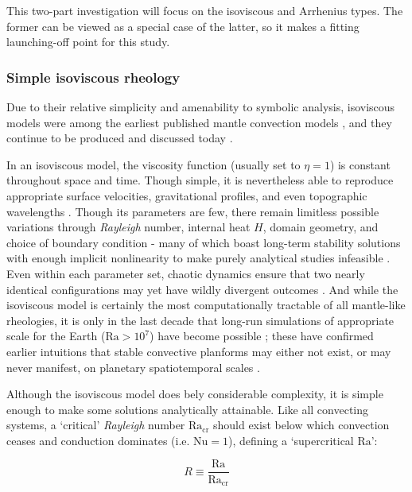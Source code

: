 \documentclass[a4paper,11pt,oneside]{book}
\begin{document}
This two-part investigation will focus on the isoviscous and Arrhenius types. The former can be viewed as a special case of the latter, so it makes a fitting launching-off point for this study.

\subsubsection{Simple isoviscous rheology}

Due to their relative simplicity and amenability to symbolic analysis, isoviscous models were among the earliest published mantle convection models \citet{McKenzie1973-gt, McKenzie1974-wb, Jarvis1986-me, Blankenbach1989-li}, and they continue to be produced and discussed today \citet{Zhong2005-lh, Weller2016-cc, Weller2016-nm, Vilella2018-il}.

In an isoviscous model, the viscosity function (usually set to $\eta=1$) is constant throughout space and time. Though simple, it is nevertheless able to reproduce appropriate surface velocities, gravitational profiles, and even topographic wavelengths \citet{McKenzie1973-gt, McKenzie1974-wb}. Though its parameters are few, there remain limitless possible variations through \textit{Rayleigh} number, internal heat $H$, domain geometry, and choice of boundary condition - many of which boast long-term stability solutions with enough implicit nonlinearity to make purely analytical studies infeasible \cite{Daly1980-xl}. Even within each parameter set, chaotic dynamics ensure that two nearly identical configurations may yet have wildly divergent outcomes \citet{Stewart1989-os, Palymskiy2003-fq}. And while the isoviscous model is certainly the most computationally tractable of all mantle-like rheologies, it is only in the last decade that long-run simulations of appropriate scale for the Earth ($\mathrm{Ra}>10^7$) have become possible \citet{Vynnycky2013-wg, Trubitsyn2018-jo}; these have confirmed earlier intuitions that stable convective planforms may either not exist, or may never manifest, on planetary spatiotemporal scales \cite{Huttig2011-jt}.

Although the isoviscous model does bely considerable complexity, it is simple enough to make some solutions analytically attainable. Like all convecting systems, a `critical' \textit{Rayleigh} number $\mathrm{Ra}_{\mathrm{cr}}$ should exist below which convection ceases and conduction dominates (i.e. $\mathrm{Nu}=1$), defining a `supercritical $\mathrm{Ra}$':

\begin{equation}
R \equiv \frac{\mathrm{Ra}}{\mathrm{Ra}_{\mathrm{cr}}}
\end{equation}
\end{document}
